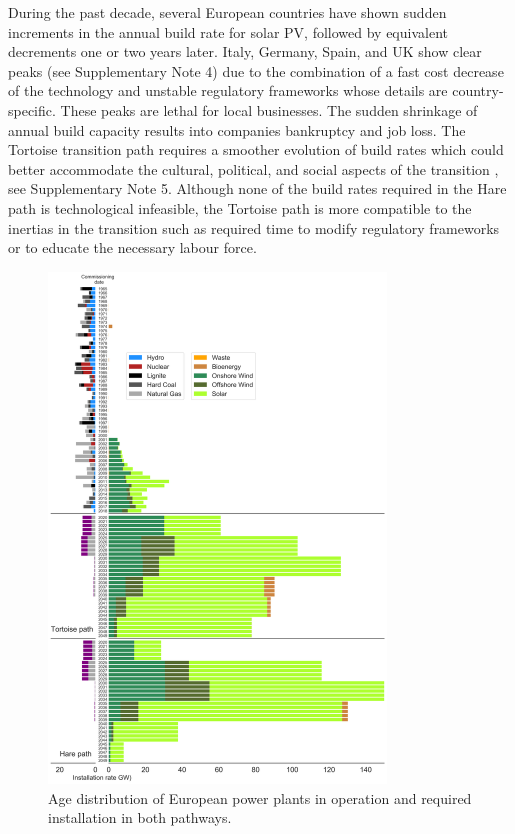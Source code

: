 \documentclass[5p]{elsarticle} %
\begin{document}
During the past decade, several European countries have shown sudden increments in the annual build rate for solar PV, followed by equivalent decrements one or two years later. Italy, Germany, Spain, and UK show clear peaks (see Supplementary Note 4)  due to the combination of a fast cost decrease of the technology and unstable regulatory frameworks whose details are country-specific. These peaks are lethal for local businesses. The sudden shrinkage of annual build capacity results into companies bankruptcy and job loss. The Tortoise transition path requires a smoother evolution of build rates which could better accommodate the cultural, political, and social aspects of the transition \cite{Geels_2017}, see Supplementary Note 5. Although none of the build rates required in the Hare path is technological infeasible, the Tortoise path is more compatible to the inertias in the transition such as required time to modify regulatory frameworks or to educate the necessary labour force. 


\begin{figure}[!h]
\centering
\includegraphics[width=0.8\textwidth]{figures/age_distribution_w_TYNDP.png}
\caption{Age distribution of European power plants in operation \cite{powerplantmatching, IRENA_2019} and required installation in both pathways.} \label{fig_age_distribution} 
\end{figure}
\end{document}
